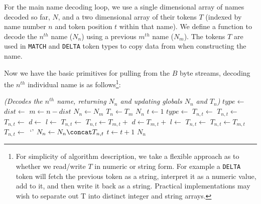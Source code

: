\documentclass[a4paper]{article}
\begin{document}
For the main name decoding loop, we use a single dimensional array of
names decoded so far, $N$, and a two dimensional array of their tokens
$T$ (indexed by name number $n$ and token position $t$ within that
name).  We define a function to decode the $n^{th}$ name ($N_n$) using
a previous $m^{th}$ name ($N_m$).  The tokens $T$ are used in
\texttt{MATCH} and \texttt{DELTA} token types to copy data from when
constructing the name.

Now we have the basic primitives for pulling from the $B$ byte
streams, decoding the $n^{th}$ individual name is as
follows\footnote{For simplicity of algorithm description, we take a
  flexible approach as to whether we read/write $T$ in numeric or
  string form.  For example a \texttt{DELTA} token will fetch the
  previous token as a string, interpret it as a numeric value, add to
  it, and then write it back as a string.  Practical implementations
  may wish to separate out T into distinct integer and string
  arrays.}:


\begin{algorithmic}[1]
\Statex
\Statex \textit{(Decodes the $n^{th}$ name, returning $N_n$ and updating globals $N_n$ and $T_n$)}
  \State $type \gets$ 
  \State $dist \gets$ 
  \State $m \gets n-dist$
    \State $N_n \gets N_m$
    \State $T_n \gets T_m$ 
    \State \Return $N_n$
  \EndIf
  \Statex
  \State $t \gets 1$ 
  \Repeat
    \State $type \gets$ 
      \State $T_{n,t} \gets$ 
      \State $T_{n,t} \gets$ 
      \State $T_{n,t} \gets$ 
      \State $d \gets$ 
      \State $l \gets$ 
      \State $T_{n,t} \gets$ 
      \State $T_{n,t} \gets T_{m,t} + $ 
      \State $d \gets T_{m,t} + $ 
      \State $l \gets$  
      \State $T_{n,t} \gets$ 
      \State $T_{n,t} \gets T_{m,t}$
    \Else
      \State $T_{n,t} \gets$\ `'
    \EndIf
    \State $N_n \gets N_n \concat T_{n,t}$
    \State $t \gets t+1$
  \State \Return $N_n$
\EndFunction
\end{algorithmic}
\end{document}

